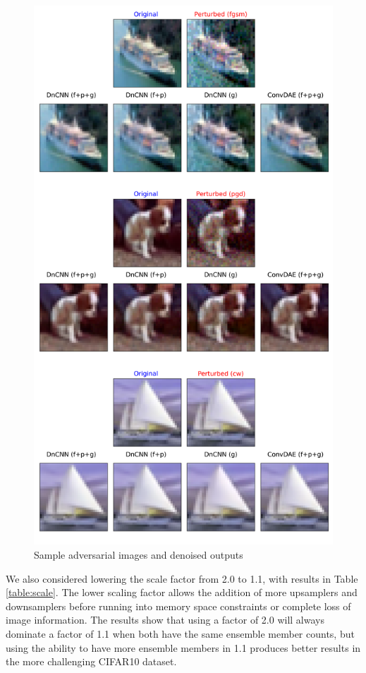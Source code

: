 \documentclass[10pt,journal,compsoc]{IEEEtran}
\begin{document}
\begin{figure}[!h]
\centering
    \includegraphics[width=0.9\columnwidth]{images/denoiser_sample.png}
    \caption{Sample adversarial images and denoised outputs}
    \label{fig:advsample}
\end{figure}

We also considered lowering the scale factor from 2.0 to 1.1, with results in Table \ref{table:scale}. The lower scaling factor allows the addition of more upsamplers and downsamplers before running into memory space constraints or complete loss of image information. The results show that using a factor of 2.0 will always dominate a factor of 1.1 when both have the same ensemble member counts, but using the ability to have more ensemble members in 1.1 produces better results in the more challenging CIFAR10 dataset.
\end{document}
